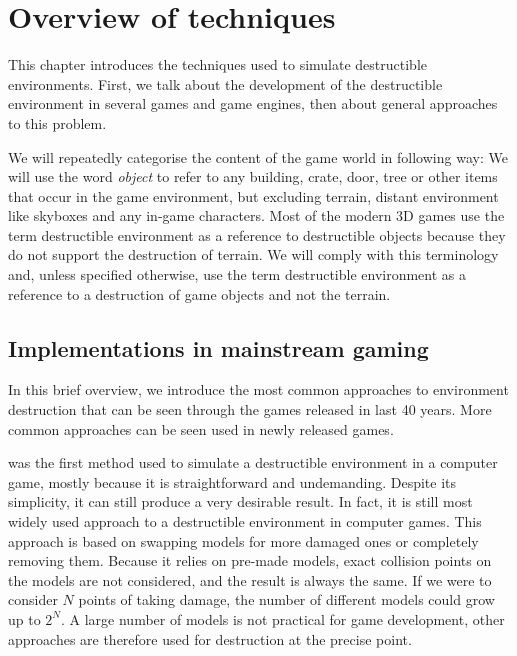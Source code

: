 \chapter{Overview of techniques}
This chapter introduces the techniques used to simulate destructible environments. First, we talk about the development of the destructible environment in several games and game engines, then about general approaches to this problem.

We will repeatedly categorise the content of the game world in following way: We will use the word \emph{object} to refer to any building, crate, door, tree or other items that occur in the game environment, but excluding terrain, distant environment like skyboxes and any in-game characters. Most of the modern 3D games use the term destructible environment as a reference to destructible objects because they do not support the destruction of terrain. We will comply with this terminology and, unless specified otherwise, use the term destructible environment as a reference to a destruction of game objects and not the terrain.

\section{Implementations in mainstream gaming}
\label{sec:common}
In this brief overview, we introduce the most common approaches to environment destruction that can be seen through the games released in last 40 years. More common approaches can be seen used in newly released games.

 was the first  method used to simulate a destructible environment in a computer game, mostly because it is straightforward and undemanding. Despite its simplicity, it can still produce a very desirable result. In fact, it is still most widely used approach to a destructible environment in computer games. This approach is based on swapping models  for more damaged ones or completely removing them. Because it relies on pre-made models, exact collision points on the models are not considered, and the result is always the same. If we were to consider $N$ points of taking damage, the number of different models could grow up to $2^N$. A large number of models is not practical for game development, other approaches are therefore used for destruction  at the precise point.

